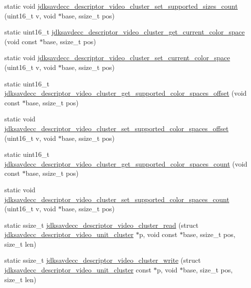 \begin{DoxyCompactItemize}
\item 
static void \hyperlink{group__descriptor__video__cluster_gaae080ce62cee3e62f522f8d7ea86c8a6}{jdksavdecc\+\_\+descriptor\+\_\+video\+\_\+cluster\+\_\+set\+\_\+supported\+\_\+sizes\+\_\+count} (uint16\+\_\+t v, void $\ast$base, ssize\+\_\+t pos)
\item 
static uint16\+\_\+t \hyperlink{group__descriptor__video__cluster_gaaf69fa8d4ff79a1f3f7ff125d840a4cb}{jdksavdecc\+\_\+descriptor\+\_\+video\+\_\+cluster\+\_\+get\+\_\+current\+\_\+color\+\_\+space} (void const $\ast$base, ssize\+\_\+t pos)
\item 
static void \hyperlink{group__descriptor__video__cluster_ga7ad6f40ef335f1ab5d53b8842a368b6e}{jdksavdecc\+\_\+descriptor\+\_\+video\+\_\+cluster\+\_\+set\+\_\+current\+\_\+color\+\_\+space} (uint16\+\_\+t v, void $\ast$base, ssize\+\_\+t pos)
\item 
static uint16\+\_\+t \hyperlink{group__descriptor__video__cluster_ga9cf87e0a57bd0f524963256c8d0bfabe}{jdksavdecc\+\_\+descriptor\+\_\+video\+\_\+cluster\+\_\+get\+\_\+supported\+\_\+color\+\_\+spaces\+\_\+offset} (void const $\ast$base, ssize\+\_\+t pos)
\item 
static void \hyperlink{group__descriptor__video__cluster_gadce5e49145c880983cd98ed174db214c}{jdksavdecc\+\_\+descriptor\+\_\+video\+\_\+cluster\+\_\+set\+\_\+supported\+\_\+color\+\_\+spaces\+\_\+offset} (uint16\+\_\+t v, void $\ast$base, ssize\+\_\+t pos)
\item 
static uint16\+\_\+t \hyperlink{group__descriptor__video__cluster_ga56622182f1cd81e0cd76302c38650703}{jdksavdecc\+\_\+descriptor\+\_\+video\+\_\+cluster\+\_\+get\+\_\+supported\+\_\+color\+\_\+spaces\+\_\+count} (void const $\ast$base, ssize\+\_\+t pos)
\item 
static void \hyperlink{group__descriptor__video__cluster_ga15df91f2e4bd9436bc56c2481fdb6e71}{jdksavdecc\+\_\+descriptor\+\_\+video\+\_\+cluster\+\_\+set\+\_\+supported\+\_\+color\+\_\+spaces\+\_\+count} (uint16\+\_\+t v, void $\ast$base, ssize\+\_\+t pos)
\item 
static ssize\+\_\+t \hyperlink{group__descriptor__video__cluster_ga7bbe7070842f45ad622fb2cf7404ed65}{jdksavdecc\+\_\+descriptor\+\_\+video\+\_\+cluster\+\_\+read} (struct \hyperlink{structjdksavdecc__descriptor__video__unit__cluster}{jdksavdecc\+\_\+descriptor\+\_\+video\+\_\+unit\+\_\+cluster} $\ast$p, void const $\ast$base, ssize\+\_\+t pos, size\+\_\+t len)
\item 
static ssize\+\_\+t \hyperlink{group__descriptor__video__cluster_ga0cfb32aa2c477ac66765b2a7459fb7e2}{jdksavdecc\+\_\+descriptor\+\_\+video\+\_\+cluster\+\_\+write} (struct \hyperlink{structjdksavdecc__descriptor__video__unit__cluster}{jdksavdecc\+\_\+descriptor\+\_\+video\+\_\+unit\+\_\+cluster} const $\ast$p, void $\ast$base, size\+\_\+t pos, size\+\_\+t len)
\end{DoxyCompactItemize}


